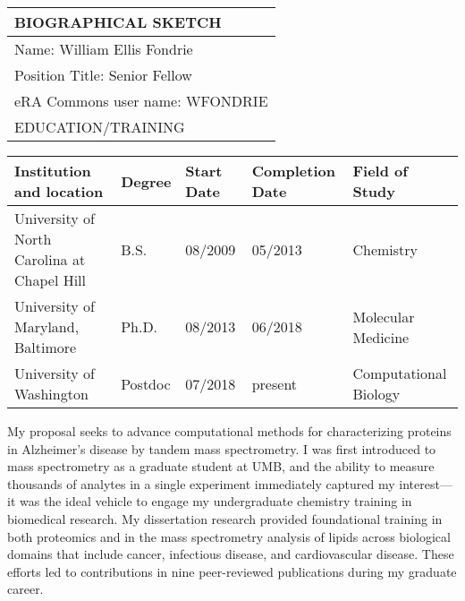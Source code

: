 \documentclass[11pt]{article}
\newcommand{\mysection}[1]{\vspace{1ex}{\bf #1} \vspace*{0.3ex}}
\begin{document}
\setcounter{page}{1}
\begin{tabular}{p{\columnwidth}}
  \hline
  \centerline {\bf BIOGRAPHICAL SKETCH} \\
  \hline
  {\sc Name}: William Ellis Fondrie \\
  \hline
  {\sc Position Title}: Senior Fellow \\
  \hline
  e{\sc RA Commons user name}: WFONDRIE  \\
  \hline
  {\sc EDUCATION/TRAINING} \\
\end{tabular}

\begin{tabular}{p{2.2in}|p{0.8in}|p{1in}|p{1.1in}|p{1.75in}}
  \hline
  \centerline{{\small {\sc Institution and location}}} &
  \centerline{{\small {\sc Degree}}} &
  \centerline{{\small {\sc Start Date}}} &
  \centerline{{\small {\sc Completion Date}}} &                                           
  \centerline{{\small {\sc Field of Study}}} \\
  \hline
  University of North Carolina at Chapel Hill & B.S.\ & 08/2009 & 05/2013 &  Chemistry \\
  University of Maryland, Baltimore & Ph.D.\ & 08/2013 & 06/2018 & Molecular Medicine\\
  University of Washington & Postdoc & 07/2018 & present & Computational Biology \\
\end{tabular}

\mysection{A. Personal Statement}


My proposal seeks to advance computational methods for characterizing proteins in Alzheimer's disease by tandem mass spectrometry. I was first introduced to mass spectrometry as a graduate student at UMB, and the ability to measure thousands of analytes in a single experiment immediately captured my interest---it was the ideal vehicle to engage my undergraduate chemistry training in biomedical research. My dissertation research provided foundational training in both proteomics and in the mass spectrometry analysis of lipids across biological domains that include cancer, infectious disease, and cardiovascular disease. These efforts led to contributions in nine peer-reviewed publications during my graduate career.\\
\end{document}
